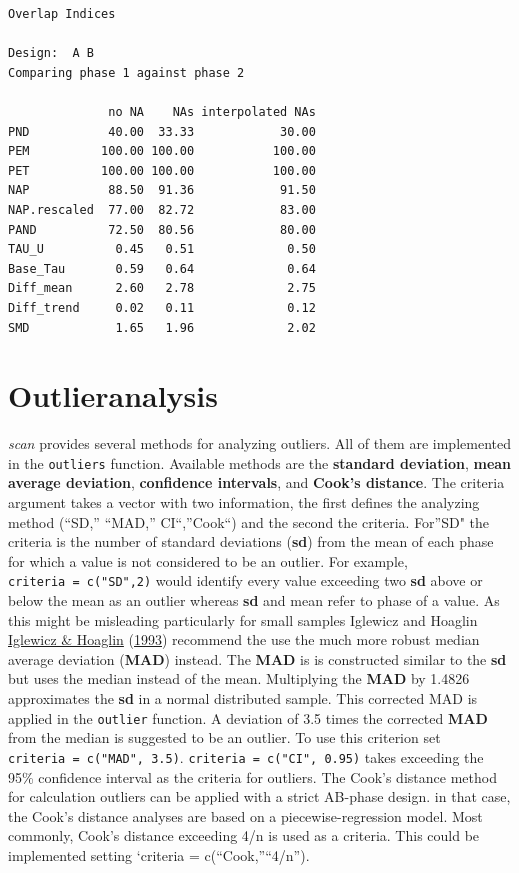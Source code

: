 \documentclass[
]{book}
\begin{document}
\begin{verbatim}
Overlap Indices

Design:  A B 
Comparing phase 1 against phase 2 

              no NA    NAs interpolated NAs
PND           40.00  33.33            30.00
PEM          100.00 100.00           100.00
PET          100.00 100.00           100.00
NAP           88.50  91.36            91.50
NAP.rescaled  77.00  82.72            83.00
PAND          72.50  80.56            80.00
TAU_U          0.45   0.51             0.50
Base_Tau       0.59   0.64             0.64
Diff_mean      2.60   2.78             2.75
Diff_trend     0.02   0.11             0.12
SMD            1.65   1.96             2.02
\end{verbatim}

\hypertarget{outlieranalysis}{%
\section{Outlieranalysis}\label{outlieranalysis}}

\emph{scan} provides several methods for analyzing outliers. All of them are implemented in the \texttt{outliers} function. Available methods are the \textbf{standard deviation}, \textbf{mean average deviation}, \textbf{confidence intervals}, and \textbf{Cook's distance}. The criteria argument takes a vector with two information, the first defines the analyzing method (``SD,'' ``MAD,'' CI``,''Cook``) and the second the criteria. For''SD" the criteria is the number of standard deviations (\textbf{sd}) from the mean of each phase for which a value is not considered to be an outlier. For example, \texttt{criteria\ =\ c("SD",2)} would identify every value exceeding two \textbf{sd} above or below the mean as an outlier whereas \textbf{sd} and mean refer to phase of a value. As this might be misleading particularly for small samples Iglewicz and Hoaglin \protect\hyperlink{ref-iglewicz_how_1993}{Iglewicz \& Hoaglin} (\protect\hyperlink{ref-iglewicz_how_1993}{1993}) recommend the use the much more robust median average deviation (\textbf{MAD}) instead. The \textbf{MAD} is is constructed similar to the \textbf{sd} but uses the median instead of the mean. Multiplying the \textbf{MAD} by 1.4826 approximates the \textbf{sd} in a normal distributed sample. This corrected MAD is applied in the \texttt{outlier} function. A deviation of 3.5 times the corrected \textbf{MAD} from the median is suggested to be an outlier. To use this criterion set \texttt{criteria\ =\ c("MAD",\ 3.5)}. \texttt{criteria\ =\ c("CI",\ 0.95)} takes exceeding the 95\% confidence interval as the criteria for outliers. The Cook's distance method for calculation outliers can be applied with a strict AB-phase design. in that case, the Cook's distance analyses are based on a piecewise-regression model. Most commonly, Cook's distance exceeding 4/n is used as a criteria. This could be implemented setting `criteria = c(``Cook,''``4/n'').
\end{document}
